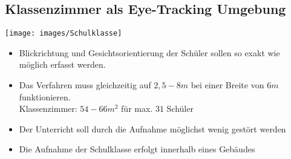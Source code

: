\subsection{Klassenzimmer als Eye-Tracking Umgebung}
\begin{frame}
\begin{center}
	\texttt{[image: images/Schulklasse]}
\end{center}
\begin{itemize}
	\item<1-> Blickrichtung und Gesichtsorientierung der Schüler sollen so exakt wie möglich erfasst werden.
	\item<1-> Das Verfahren muss gleichzeitig auf $2,5 - 8m$ bei einer Breite von $6m$ funktionieren.\\
	Klassenzimmer: $54-66m^2$ für max. $31$ Schüler
	\item<1-> Der Unterricht soll durch die Aufnahme möglichst wenig gestört werden
	\item<1-> Die Aufnahme der Schulklasse erfolgt innerhalb eines Gebäudes
\end{itemize}
\end{frame}